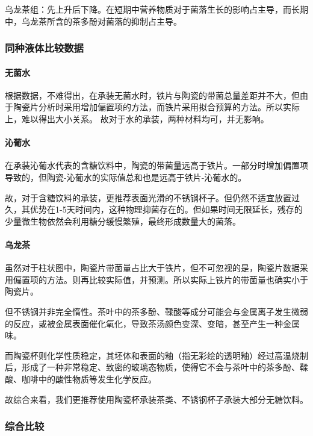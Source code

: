 \documentclass[12pt,a4paper]{ctexart}
\begin{document}
乌龙茶组：先上升后下降。在短期中营养物质对于菌落生长的影响占主导，而长期中，乌龙茶所含的茶多酚对菌落的抑制占主导。
 


\subsubsection{同种液体比较数据}
\paragraph{无菌水}

根据数据，不难得出，在承装无菌水时，铁片与陶瓷的带菌总量差距并不大，但由于陶瓷片分析时采用增加偏置项的方法，而铁片采用拟合预算的方法。所以实际上，难以得出大小关系。
故对于水的承装，两种材料均可，并无影响。


\paragraph{沁葡水}
在承装沁葡水代表的含糖饮料中，陶瓷的带菌量远高于铁片。一部分时增加偏置项导致的，但陶瓷-沁葡水的实际值总和也是远高于铁片-沁葡水的。

故，对于含糖饮料的承装，更推荐表面光滑的不锈钢杯子。但仍然不适宜放置过久，其优势在1-5天时间内，这种物理抑菌存在的。但如果时间无限延长，残存的少量微生物依然会利用糖分缓慢繁殖，最终形成数量大的菌落。

\paragraph{乌龙茶}
虽然对于柱状图中，陶瓷片带菌量占比大于铁片，但不可忽视的是，陶瓷片数据采用偏置项的方法。则再比较实际值，并预测。所以实际上铁片的带菌量也确实小于陶瓷片。

但不锈钢并非完全惰性。茶叶中的茶多酚、鞣酸等成分可能会与金属离子发生微弱的反应，或被金属表面催化氧化，导致茶汤颜色变深、变暗，甚至产生一种金属味。\cite{JSHJ201504002}

而陶瓷杯则化学性质稳定，其坯体和表面的釉（指无彩绘的透明釉）经过高温烧制后，形成了一种非常稳定、致密的玻璃态物质，使得它不会与茶叶中的茶多酚、鞣酸、咖啡中的酸性物质等发生化学反应。 

故综合来看，我们更推荐使用陶瓷杯承装茶类、不锈钢杯子承装大部分无糖饮料。



\subsubsection{综合比较}
\end{document}
